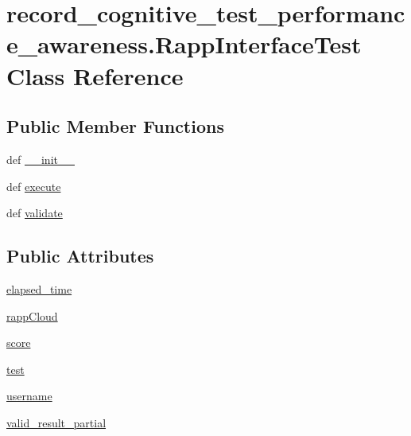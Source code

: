 \hypertarget{classrecord__cognitive__test__performance__awareness_1_1RappInterfaceTest}{\section{record\-\_\-cognitive\-\_\-test\-\_\-performance\-\_\-awareness.\-Rapp\-Interface\-Test Class Reference}
\label{classrecord__cognitive__test__performance__awareness_1_1RappInterfaceTest}
}
\subsection*{Public Member Functions}
\begin{DoxyCompactItemize}
\item 
def \hyperlink{classrecord__cognitive__test__performance__awareness_1_1RappInterfaceTest_adf63a074ef15bcadcacd0f68ad7445dc}{\-\_\-\-\_\-init\-\_\-\-\_\-}
\item 
def \hyperlink{classrecord__cognitive__test__performance__awareness_1_1RappInterfaceTest_a56ac2e1dc9518e302151d980882052e7}{execute}
\item 
def \hyperlink{classrecord__cognitive__test__performance__awareness_1_1RappInterfaceTest_ad9fc0ba0765b5883e9edf9551275fcbc}{validate}
\end{DoxyCompactItemize}
\subsection*{Public Attributes}
\begin{DoxyCompactItemize}
\item 
\hyperlink{classrecord__cognitive__test__performance__awareness_1_1RappInterfaceTest_abd7737ffe7b3db058e8a00db3e8d06ff}{elapsed\-\_\-time}
\item 
\hyperlink{classrecord__cognitive__test__performance__awareness_1_1RappInterfaceTest_a22afd4de94643bff6061b34ed4067fd2}{rapp\-Cloud}
\item 
\hyperlink{classrecord__cognitive__test__performance__awareness_1_1RappInterfaceTest_afc57ae6c22552b3571df01134d8ba05a}{score}
\item 
\hyperlink{classrecord__cognitive__test__performance__awareness_1_1RappInterfaceTest_ad936c47d77b0d976342efd56a2425c88}{test}
\item 
\hyperlink{classrecord__cognitive__test__performance__awareness_1_1RappInterfaceTest_a2df728119bfa3ea56b21b54fb01a81bb}{username}
\item 
\hyperlink{classrecord__cognitive__test__performance__awareness_1_1RappInterfaceTest_a7284c8bf436622537d94a4ba146be1fe}{valid\-\_\-result\-\_\-partial}
\end{DoxyCompactItemize}


